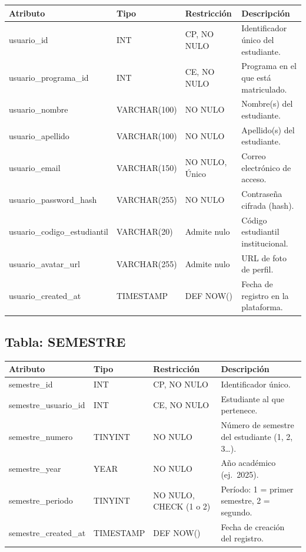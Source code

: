 \documentclass[12pt, letterpaper, twoside]{article}
\begin{document}
\begin{center}
\begin{tabular}{p{4.2cm} p{2.8cm} p{2.8cm} p{3.8cm}}
\toprule
\textbf{Atributo} & \textbf{Tipo} & \textbf{Restricción} & \textbf{Descripción} \\
\midrule
usuario\_id                  & INT          & CP, NO NULO      & Identificador único del estudiante. \\
usuario\_programa\_id        & INT          & CE, NO NULO      & Programa en el que está matriculado. \\
usuario\_nombre              & VARCHAR(100) & NO NULO          & Nombre(s) del estudiante. \\
usuario\_apellido            & VARCHAR(100) & NO NULO          & Apellido(s) del estudiante. \\
usuario\_email               & VARCHAR(150) & NO NULO, Único   & Correo electrónico de acceso. \\
usuario\_password\_hash      & VARCHAR(255) & NO NULO          & Contraseña cifrada (hash). \\
usuario\_codigo\_estudiantil & VARCHAR(20)  & Admite nulo      & Código estudiantil institucional. \\
usuario\_avatar\_url         & VARCHAR(255) & Admite nulo      & URL de foto de perfil. \\
usuario\_created\_at         & TIMESTAMP    & DEF NOW()        & Fecha de registro en la plataforma. \\
\bottomrule
\end{tabular}
\end{center}

\subsection{Tabla: SEMESTRE}

\begin{center}
\begin{tabular}{p{4.2cm} p{2.8cm} p{2.8cm} p{3.8cm}}
\toprule
\textbf{Atributo} & \textbf{Tipo} & \textbf{Restricción} & \textbf{Descripción} \\
\midrule
semestre\_id          & INT      & CP, NO NULO              & Identificador único. \\
semestre\_usuario\_id & INT      & CE, NO NULO              & Estudiante al que pertenece. \\
semestre\_numero      & TINYINT  & NO NULO                  & Número de semestre del estudiante (1, 2, 3\ldots). \\
semestre\_year        & YEAR     & NO NULO                  & Año académico (ej.\ 2025). \\
semestre\_periodo     & TINYINT  & NO NULO, CHECK (1 o 2)   & Período: 1 = primer semestre, 2 = segundo. \\
semestre\_created\_at & TIMESTAMP & DEF NOW()               & Fecha de creación del registro. \\
\bottomrule
\end{tabular}
\end{center}
\end{document}
